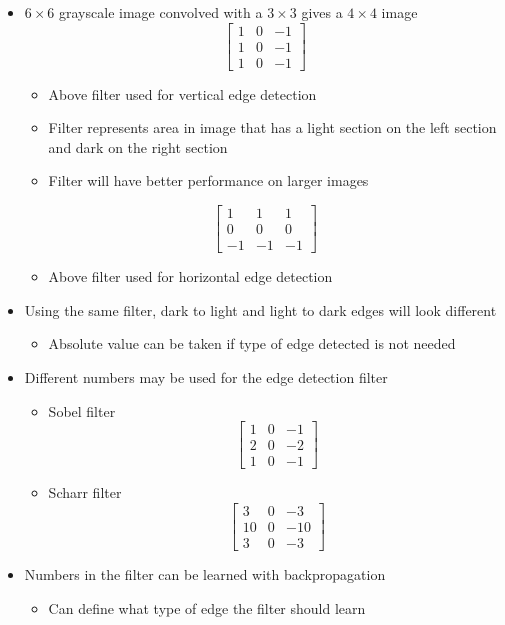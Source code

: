 \documentclass[12pt, letterpaper]{article}
\begin{document}
\begin{itemize}
\begin{itemize}
        \end{itemize}
        \item $6\times6$ grayscale image convolved with a $3\times3$  gives a $4\times4$ image
        $$\begin{bmatrix}
            1 & 0 & -1 \\
            1 & 0 & -1 \\
            1 & 0 & -1
        \end{bmatrix}$$
        \begin{itemize}
            \item Above filter used for vertical edge detection 
            \item Filter represents area in image that has a light section on the left section and dark on the right section
            \item Filter will have better performance on larger images
        \end{itemize}
        $$\begin{bmatrix}
            1 & 1 & 1 \\
            0 & 0 & 0 \\
            -1 & -1 & -1
        \end{bmatrix}$$
        \begin{itemize}
            \item Above filter used for horizontal edge detection
        \end{itemize}
        \item Using the same filter, dark to light and light to dark edges will look different
        \begin{itemize}
            \item Absolute value can be taken if type of edge detected is not needed
        \end{itemize}
        \item Different numbers may be used for the edge detection filter
        \begin{itemize}
            \item Sobel filter
            $$\begin{bmatrix}
                1 & 0 & -1 \\
                2 & 0 & -2 \\
                1 & 0 & -1
            \end{bmatrix}$$
            \item Scharr filter
            $$\begin{bmatrix}
                3 & 0 & -3 \\
                10 & 0 & -10 \\
                3 & 0 & -3
            \end{bmatrix}$$ 
        \end{itemize}
        \item Numbers in the filter can be learned with backpropagation 
        \begin{itemize}
            \item Can define what type of edge the filter should learn
        \end{itemize}
    \end{itemize}
\end{document}
